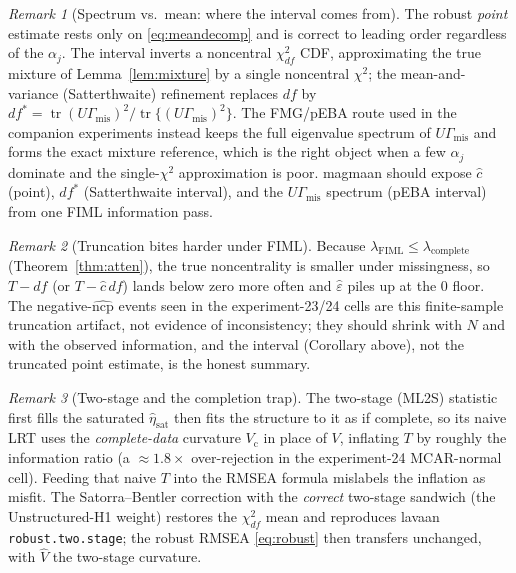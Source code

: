 \documentclass[11pt]{article}
\newcommand{\tr}{\operatorname{tr}}
\newcommand{\Gmis}{\Gamma_{\mathrm{mis}}}
\newcommand{\rmsea}{\widehat{\varepsilon}}
\theoremstyle{plain}
\theoremstyle{remark}
\newtheorem*{remark}{Remark}
\begin{document}
\begin{remark}[Spectrum vs.\ mean: where the interval comes from]
The robust \emph{point} estimate rests only on \eqref{eq:meandecomp} and is
correct to leading order regardless of the $\alpha_j$. The interval inverts a
noncentral $\chi^2_{df}$ CDF, approximating the true mixture of
Lemma~\ref{lem:mixture} by a single noncentral $\chi^2$; the
mean-and-variance (Satterthwaite) refinement replaces $df$ by
$df^\ast=\tr(U\Gmis)^2/\tr\{(U\Gmis)^2\}$. The FMG/pEBA route used in the
companion experiments instead keeps the full eigenvalue spectrum of $U\Gmis$ and
forms the exact mixture reference, which is the right object when a few
$\alpha_j$ dominate and the single-$\chi^2$ approximation is poor. magmaan
should expose $\hat c$ (point), $df^\ast$ (Satterthwaite interval), and the
$U\Gmis$ spectrum (pEBA interval) from one FIML information pass.
\end{remark}

\begin{remark}[Truncation bites harder under FIML]
Because $\lambda_{\mathrm{FIML}}\le\lambda_{\mathrm{complete}}$
(Theorem~\ref{thm:atten}), the true noncentrality is smaller under missingness,
so $T-df$ (or $T-\hat c\,df$) lands below zero more often and $\rmsea$ piles up at
the $0$ floor. The negative-$\widehat{\mathrm{ncp}}$ events seen in the
experiment-23/24 cells are this finite-sample truncation artifact, not evidence
of inconsistency; they should shrink with $N$ and with the observed information,
and the interval (Corollary above), not the truncated point estimate, is the
honest summary.
\end{remark}

\begin{remark}[Two-stage and the completion trap]
The two-stage (ML2S) statistic first fills the saturated $\hat\eta_{\mathrm{sat}}$
then fits the structure to it as if complete, so its naive LRT uses the
\emph{complete-data} curvature $V_{\mathrm c}$ in place of $V$, inflating $T$ by
roughly the information ratio (a $\approx1.8\times$ over-rejection in the
experiment-24 MCAR-normal cell). Feeding that naive $T$ into the RMSEA formula
mislabels the inflation as misfit. The Satorra--Bentler correction with the
\emph{correct} two-stage sandwich (the Unstructured-H1 weight) restores the
$\chi^2_{df}$ mean and reproduces lavaan \texttt{robust.two.stage}; the robust
RMSEA \eqref{eq:robust} then transfers unchanged, with $\hat V$ the two-stage
curvature.
\end{remark}
\end{document}
